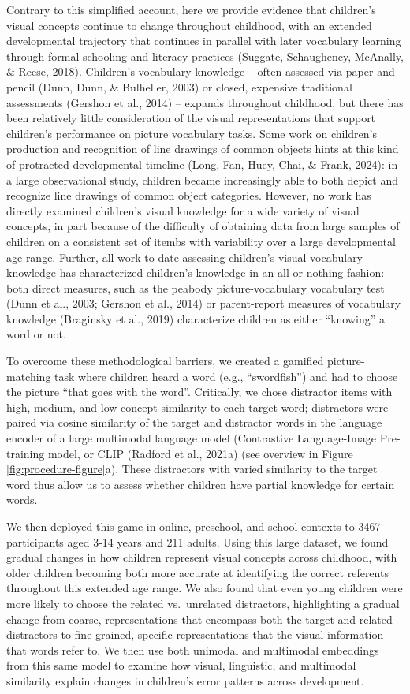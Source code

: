 \documentclass[
  man,mask]{apa6}
\begin{document}
Contrary to this simplified account, here we provide evidence that children's visual concepts continue to change throughout childhood, with an extended developmental trajectory that continues in parallel with later vocabulary learning through formal schooling and literacy practices (Suggate, Schaughency, McAnally, \& Reese, 2018). Children's vocabulary knowledge -- often assessed via paper-and-pencil (Dunn, Dunn, \& Bulheller, 2003) or closed, expensive traditional assessments (Gershon et al., 2014) -- expands throughout childhood, but there has been relatively little consideration of the visual representations that support children's performance on picture vocabulary tasks. Some work on children's production and recognition of line drawings of common objects hints at this kind of protracted developmental timeline (Long, Fan, Huey, Chai, \& Frank, 2024): in a large observational study, children became increasingly able to both depict and recognize line drawings of common object categories. However, no work has directly examined children's visual knowledge for a wide variety of visual concepts, in part because of the difficulty of obtaining data from large samples of children on a consistent set of itembs with variability over a large developmental age range. Further, all work to date assessing children's visual vocabulary knowledge has characterized children's knowledge in an all-or-nothing fashion: both direct measures, such as the peabody picture-vocabulary vocabulary test (Dunn et al., 2003; Gershon et al., 2014) or parent-report measures of vocabulary knowledge (Braginsky et al., 2019) characterize children as either ``knowing'' a word or not.

To overcome these methodological barriers, we created a gamified picture-matching task where children heard a word (e.g., ``swordfish'') and had to choose the picture ``that goes with the word''. Critically, we chose distractor items with high, medium, and low concept similarity to each target word; distractors were paired via cosine similarity of the target and distractor words in the language encoder of a large multimodal language model (Contrastive Language-Image Pre-training model, or CLIP (Radford et al., 2021a) (see overview in Figure \ref{fig:procedure-figure}a). These distractors with varied similarity to the target word thus allow us to assess whether children have partial knowledge for certain words.

We then deployed this game in online, preschool, and school contexts to 3467 participants aged 3-14 years and 211 adults. Using this large dataset, we found gradual changes in how children represent visual concepts across childhood, with older children becoming both more accurate at identifying the correct referents throughout this extended age range. We also found that even young children were more likely to choose the related vs.~unrelated distractors, highlighting a gradual change from coarse, representations that encompass both the target and related distractors to fine-grained, specific representations that the visual information that words refer to. We then use both unimodal and multimodal embeddings from this same model to examine how visual, linguistic, and multimodal similarity explain changes in children's error patterns across development.
\end{document}
